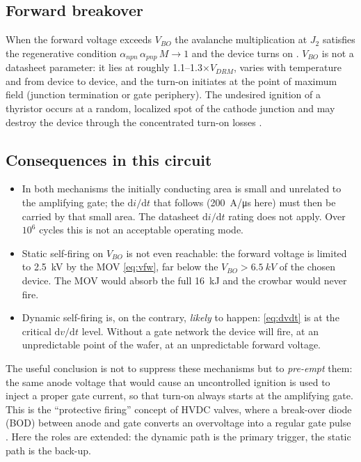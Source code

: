 \documentclass[11pt,a4paper]{article}
\begin{document}
\subsection{Forward breakover}

When the forward voltage exceeds $V_{BO}$ the avalanche multiplication at $J_2$ satisfies the
regenerative condition $\alpha_{npn}\,\alpha_{pnp}\,M \to 1$ and the device turns on
\cite{baliga}. $V_{BO}$ is not a datasheet parameter: it lies at roughly
\numrange{1.1}{1.3}$\times V_{DRM}$, varies with temperature and from device to device, and the
turn-on initiates at the point of maximum field (junction termination or gate periphery). The
undesired ignition of a thyristor occurs at a random, localized spot of the cathode
junction and may destroy the device through the concentrated turn-on losses \cite{bodpatent}.

\subsection{Consequences in this circuit}

\begin{itemize}
\item In both mechanisms the initially conducting area is small and unrelated to the
      amplifying gate; the $\mathrm{d}i/\mathrm{d}t$ that follows (\SI{200}{A/\micro s} here) must
      then be carried by that small area. The datasheet $\mathrm{d}i/\mathrm{d}t$ rating does not
      apply. Over $10^6$ cycles this is not an acceptable operating mode.
\item Static self-firing on $V_{BO}$ is not even reachable: the forward voltage is limited to
      \SI{2.5}{kV} by the MOV \eqref{eq:vfw}, far below the $V_{BO} > \SI{6.5}{kV}$ of the chosen
      device. The MOV would absorb the full \SI{16}{kJ} and the crowbar would never fire.
\item Dynamic self-firing is, on the contrary, \emph{likely} to happen: \eqref{eq:dvdt} is at the
      critical $\mathrm{d}v/\mathrm{d}t$ level. Without a gate network the device will fire, at an
      unpredictable point of the wafer, at an unpredictable forward voltage.
\end{itemize}

The useful conclusion is not to suppress these mechanisms but to \emph{pre-empt} them: the same
anode voltage that would cause an uncontrolled ignition is used to inject a proper gate current,
so that turn-on always starts at the amplifying gate. This is the ``protective firing'' concept of
HVDC valves, where a break-over diode (BOD) between anode and gate converts an overvoltage into a
regular gate pulse \cite{bodpatent,arrillaga}. Here the roles are extended: the dynamic path is
the primary trigger, the static path is the back-up.
\end{document}
